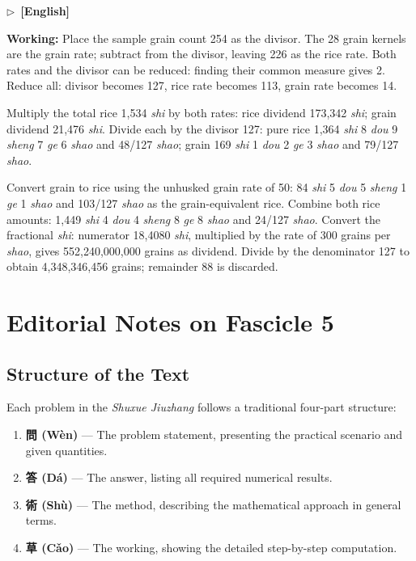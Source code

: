 \documentclass[10pt,a4paper]{article}
\newcommand{\ENmarker}{\noindent\textcolor{enlabel}{$\triangleright$\ \textbf{[English]}}\par}
\newcommand{\WorkingEn}[1]{\par\noindent\textbf{\color{workingcolor}Working:} #1\par}
\begin{document}
\ENmarker
\WorkingEn{Place the sample grain count 254 as the divisor. The 28 grain kernels are the grain rate; subtract from the divisor, leaving 226 as the rice rate. Both rates and the divisor can be reduced: finding their common measure gives 2. Reduce all: divisor becomes 127, rice rate becomes 113, grain rate becomes 14.

Multiply the total rice 1,534 \textit{shi} by both rates: rice dividend 173,342 \textit{shi}; grain dividend 21,476 \textit{shi}. Divide each by the divisor 127: pure rice 1,364 \textit{shi} 8 \textit{dou} 9 \textit{sheng} 7 \textit{ge} 6 \textit{shao} and 48/127 \textit{shao}; grain 169 \textit{shi} 1 \textit{dou} 2 \textit{ge} 3 \textit{shao} and 79/127 \textit{shao}.

Convert grain to rice using the unhusked grain rate of 50: 84 \textit{shi} 5 \textit{dou} 5 \textit{sheng} 1 \textit{ge} 1 \textit{shao} and 103/127 \textit{shao} as the grain-equivalent rice. Combine both rice amounts: 1,449 \textit{shi} 4 \textit{dou} 4 \textit{sheng} 8 \textit{ge} 8 \textit{shao} and 24/127 \textit{shao}. Convert the fractional \textit{shi}: numerator 18,4080 \textit{shi}, multiplied by the rate of 300 grains per \textit{shao}, gives 552,240,000,000 grains as dividend. Divide by the denominator 127 to obtain 4,348,346,456 grains; remainder 88 is discarded.}


\newpage
\section*{Editorial Notes on Fascicle 5}

\subsection*{Structure of the Text}

Each problem in the \textit{Shuxue Jiuzhang} follows a traditional four-part structure:

\begin{enumerate}
    \item \textbf{問 (W\`{e}n)} --- The problem statement, presenting the practical scenario and given quantities.
    \item \textbf{答 (D\'{a})} --- The answer, listing all required numerical results.
    \item \textbf{術 (Sh\`{u})} --- The method, describing the mathematical approach in general terms.
    \item \textbf{草 (C\v{a}o)} --- The working, showing the detailed step-by-step computation.
\end{enumerate}
\end{document}
